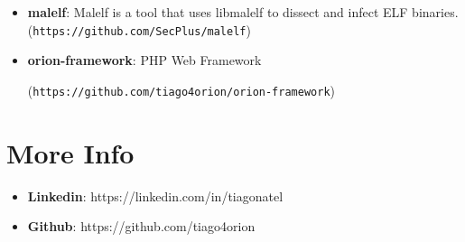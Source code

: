 \documentclass[margin]{res}
\begin{document}
\begin{resume}
\begin{itemize}
		    \item \textbf{malelf}: Malelf is a tool that uses libmalelf to dissect and infect ELF binaries.
		                           (\texttt{https://github.com/SecPlus/malelf})
		 \item \textbf{orion-framework}: PHP Web Framework

		 	(\texttt{https://github.com/tiago4orion/orion-framework})

		\end{itemize}

\section{More Info}
    \begin{itemize}
        \item \textbf{Linkedin}: https://linkedin.com/in/tiagonatel
         \item \textbf{Github}: https://github.com/tiago4orion
    \end{itemize}


\end{resume}
\end{document}
